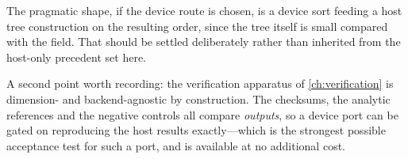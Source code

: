 The pragmatic shape, if the device route is chosen, is a device sort feeding a
host tree construction on the resulting order, since the tree itself is small
compared with the field. That should be settled deliberately rather than
inherited from the host-only precedent set here.

A second point worth recording: the verification apparatus of
\cref{ch:verification} is dimension- and backend-agnostic by construction. The
checksums, the analytic references and the negative controls all compare
\emph{outputs}, so a device port can be gated on reproducing the host results
exactly---which is the strongest possible acceptance test for such a port, and is
available at no additional cost.
